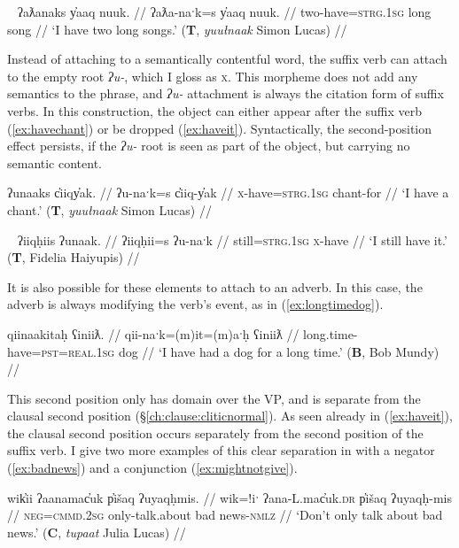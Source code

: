 \ex~ \label{ex:havetwolongsongs}
\begingl
\glpreamble ʔaƛanaks y̓aaq nuuk. //
\gla ʔaƛa-naˑk=s y̓aaq nuuk. //
\glb two-have=\textsc{strg.1sg} long song //
\glft `I have two long songs.' (\textbf{T}, \textit{yuułnaak} Simon Lucas) //
\endgl
\xe

Instead of attaching to a semantically contentful word, the suffix verb can attach to the empty root \textit{ʔu-}, which I gloss as \textsc{x}. This morpheme does not add any semantics to the phrase, and \textit{ʔu-} attachment is always the citation form of suffix verbs. In this construction, the object can either appear after the suffix verb (\ref{ex:havechant}) or be dropped (\ref{ex:haveit}). Syntactically, the second-position effect persists, if the \textit{ʔu-} root is seen as part of the object, but carrying no semantic content.

\ex \label{ex:havechant}
\begingl
\glpreamble ʔunaaks c̓iiqy̓ak. //
\gla ʔu-naˑk=s c̓iiq-y̓ak //
\glb \textsc{x}-have=\textsc{strg.1sg} chant-for //
\glft `I have a chant.' (\textbf{T}, \textit{yuułnaak} Simon Lucas) //
\endgl
\xe

\ex~ \label{ex:haveit}
\begingl
\glpreamble ʔiiqḥiis ʔunaak. //
\gla ʔiiqḥii=s ʔu-naˑk //
\glb still=\textsc{strg.1sg} \textsc{x}-have //
\glft `I still have it.' (\textbf{T}, Fidelia Haiyupis) //
\endgl
\xe

It is also possible for these elements to attach to an adverb. In this case, the adverb is always modifying the verb's event, as in (\ref{ex:longtimedog}).

\ex \label{ex:longtimedog}
\begingl
\glpreamble qiinaakitaḥ ʕiniiƛ. //
\gla qii-naˑk=(m)it=(m)aˑḥ ʕiniiƛ //
\glb long.time-have=\textsc{pst}=\textsc{real.1sg} dog //
\glft `I have had a dog for a long time.' (\textbf{B}, Bob Mundy) //
\endgl
\xe

This second position only has domain over the VP, and is separate from the clausal second position (\S\ref{ch:clause:cliticnormal}). As seen already in (\ref{ex:haveit}), the clausal second position occurs separately from the second position of the suffix verb. I give two more examples of this clear separation in with a negator (\ref{ex:badnews}) and a conjunction (\ref{ex:mightnotgive}).


\ex \label{ex:badnews}
\begingl
\glpreamble wik̓ii ʔaanamac̓uk p̓išaq ʔuyaqḥmis. //
\gla wik=!iˑ ʔana-L.mac̓uk.\textsc{dr} p̓išaq ʔuyaqḥ-mis //
\glb \textsc{neg}=\textsc{cmmd.2sg} only-talk.about bad news-\textsc{nmlz} //
\glft `Don't only talk about bad news.' (\textbf{C}, \textit{tupaat} Julia Lucas) //
\endgl
\xe

